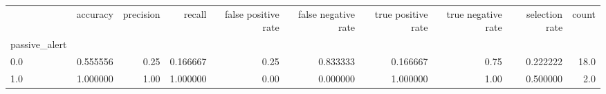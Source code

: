 \begin{tabular}{lrrrrrrrrr}
\toprule
{} &  accuracy &  precision &    recall &  false positive rate &  false negative rate &  true positive rate &  true negative rate &  selection rate &  count \\
passive\_alert &           &            &           &                      &                      &                     &                     &                 &        \\
\midrule
0.0           &  0.555556 &       0.25 &  0.166667 &                 0.25 &             0.833333 &            0.166667 &                0.75 &        0.222222 &   18.0 \\
1.0           &  1.000000 &       1.00 &  1.000000 &                 0.00 &             0.000000 &            1.000000 &                1.00 &        0.500000 &    2.0 \\
\bottomrule
\end{tabular}
